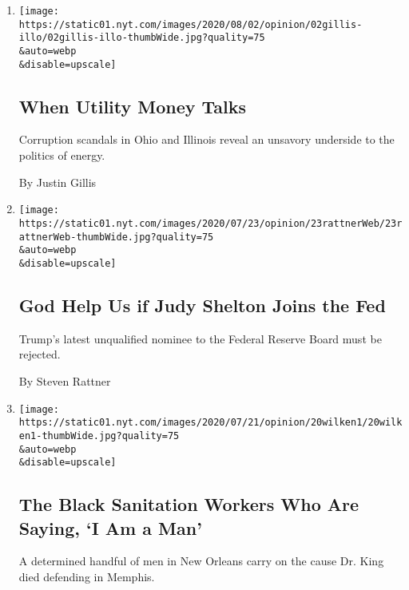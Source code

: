 \begin{enumerate}
\def\labelenumi{\arabic{enumi}.}
\item
  \href{/2020/08/02/opinion/utility-corruption-energy.html}{}

  \texttt{[image: https://static01.nyt.com/images/2020/08/02/opinion/02gillis-illo/02gillis-illo-thumbWide.jpg?quality=75\\\&auto=webp\\\&disable=upscale]}

  \hypertarget{when-utility-money-talks}{%
  \subsection{When Utility Money Talks}\label{when-utility-money-talks}}

  Corruption scandals in Ohio and Illinois reveal an unsavory underside
  to the politics of energy.

  By Justin Gillis
\item
  \href{/2020/07/22/opinion/federal-reserve-judy-shelton.html}{}

  \texttt{[image: https://static01.nyt.com/images/2020/07/23/opinion/23rattnerWeb/23rattnerWeb-thumbWide.jpg?quality=75\\\&auto=webp\\\&disable=upscale]}

  \hypertarget{god-help-us-if-judy-shelton-joins-the-fed}{%
  \subsection{God Help Us if Judy Shelton Joins the
  Fed}\label{god-help-us-if-judy-shelton-joins-the-fed}}

  Trump's latest unqualified nominee to the Federal Reserve Board must
  be rejected.

  By Steven Rattner
\item
  \href{/2020/07/20/opinion/new-orleans-garbage-strike.html}{}

  \texttt{[image: https://static01.nyt.com/images/2020/07/21/opinion/20wilken1/20wilken1-thumbWide.jpg?quality=75\\\&auto=webp\\\&disable=upscale]}

  \hypertarget{the-black-sanitation-workers-who-are-saying-i-am-a-man}{%
  \subsection{The Black Sanitation Workers Who Are Saying, `I Am a
  Man'}\label{the-black-sanitation-workers-who-are-saying-i-am-a-man}}

  A determined handful of men in New Orleans carry on the cause Dr. King
  died defending in Memphis.


\end{enumerate}
